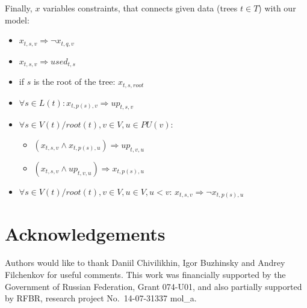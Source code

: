 \documentclass[runningheads, envcountsame, a4paper]{llncs}
\begin{document}
Finally, $x$ variables constraints, that connects given data (trees $t \in T$) with our model:
\begin{itemize}
\item $x_{t,s,v} \Rightarrow \neg x_{t,q,v}$
\item $x_{t,s,v} \Rightarrow used_{t,s}$
\item if $s$ is the root of the tree: $x_{t,s,root}$
\item $\forall s \in L(t): x_{t,p(s),v} \Rightarrow up_{t,s,v}$
\item $\forall s \in V(t) / root(t), v \in V, u \in PU(v)$:
    \begin{itemize}
    \item $(x_{t,s,v} \wedge x_{t,p(s),u}) \Rightarrow up_{t,v,u}$
    \item $(x_{t,s,v} \wedge up_{t,v,u}) \Rightarrow x_{t,p(s),u}$
    \end{itemize}
\item $\forall s \in V(t) / root(t), v \in V, u \in V, u < v$: 
    $x_{t,s,v} \Rightarrow \neg x_{t,p(s),u}$
    

\end{itemize}



\section*{Acknowledgements}

Authors would like to thank Daniil Chivilikhin, Igor Buzhinsky and Andrey Filchenkov for useful comments.
This work was financially supported by the Government of Russian Federation, Grant 074-U01,
and also partially supported by RFBR, research project No.~14-07-31337 mol\_a.



\clearpage
\end{document}
